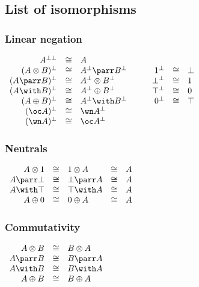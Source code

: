 \subsection{List of isomorphisms}\label{list-of-isomorphisms}

\subsubsection{Linear negation}\label{linear-negation-1}

\(\begin{array}{rclcrcl}
  A\biorth & \cong&  A\\
  (A\tens B)\orth & \cong&  A\orth\parr B\orth & \quad&  \one\orth  & \cong&  \bot\\
  (A\parr B)\orth & \cong&  A\orth\tens B\orth & \quad&  \bot\orth  & \cong&  \one\\
  (A\with B)\orth & \cong&  A\orth\plus B\orth & \quad&  \top\orth  & \cong&  \zero\\
  (A\plus B)\orth & \cong&  A\orth\with B\orth & \quad&  \zero\orth & \cong&  \top\\
  (\oc A)\orth & \cong&  \wn A\orth\\
  (\wn A)\orth & \cong&  \oc A\orth\\
\end{array}\)

\subsubsection{Neutrals}\label{neutrals}

\(\begin{array}{rclcl}
  A\tens\one  & \cong&  \one\tens A&\cong &A\\
  A\parr\bot  & \cong&  \bot\parr A&\cong &A\\
  A\with\top  & \cong&  \top\with A&\cong &A\\
  A\plus\zero & \cong& \zero\plus A&\cong &A\\
\end{array}\)

\subsubsection{Commutativity}\label{commutativity-1}

\(\begin{array}{rcl}
  A\tens B & \cong&  B\tens A\\
  A\parr B & \cong&  B\parr A\\
  A\with B & \cong&  B\with A\\
  A\plus B & \cong&  B\plus A\\
\end{array}\)

